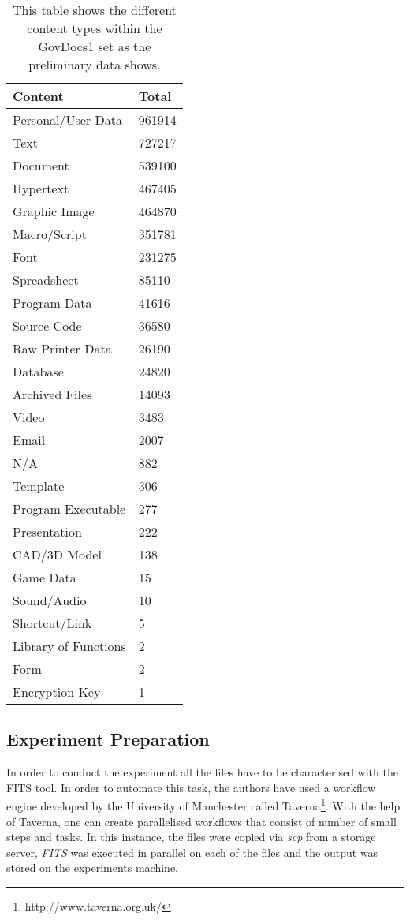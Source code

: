 \begin{table}
\centering
\begin{tabular}{l || l }
\hline
Content & Total \\
\hline
\hline
  Personal/User Data & 961914\\
  Text & 727217 \\
  Document & 539100 \\
  Hypertext & 467405 \\
  Graphic Image & 464870 \\
  Macro/Script &    351781 \\
  Font & 231275 \\
  Spreadsheet & 85110\\
  Program Data  &      41616\\
  Source Code & 36580 \\
  Raw Printer Data &  26190 \\
  Database & 24820 \\
  Archived Files & 14093 \\
  Video &  3483 \\
  Email & 2007 \\
  N/A  & 882 \\
  Template & 306\\
  Program Executable & 277\\
  Presentation & 222 \\
  CAD/3D Model & 138 \\
  Game Data &15\\
  Sound/Audio & 10 \\
  Shortcut/Link & 5 \\
  Library of Functions & 2\\
  Form & 2 \\
  Encryption Key  & 1\\
\hline
\end{tabular}
\label{tab:govdoc1_content}
\caption{This table shows the different content types within the GovDocs1 set as the preliminary data shows.}
\end{table}

\subsection{Experiment Preparation}
In order to conduct the experiment all the files have to be characterised with the FITS tool. In order to automate this task, the authors have used a workflow engine developed by the University of Manchester called Taverna\footnote{http://www.taverna.org.uk/}. With the help of Taverna, one can create parallelised workflows that consist of number of small steps and tasks. In this instance, the files were copied via \textit{scp} from a storage server, \textit{FITS} was executed in parallel on each of the files and the output was stored on the experiments machine.


